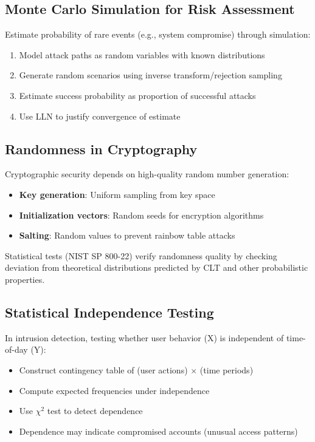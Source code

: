 \documentclass[12pt,a4paper]{article}
\begin{document}
\subsection{Monte Carlo Simulation for Risk Assessment}

Estimate probability of rare events (e.g., system compromise) through simulation:

\begin{enumerate}
\item Model attack paths as random variables with known distributions
\item Generate random scenarios using inverse transform/rejection sampling
\item Estimate success probability as proportion of successful attacks
\item Use LLN to justify convergence of estimate
\end{enumerate}

\subsection{Randomness in Cryptography}

Cryptographic security depends on high-quality random number generation:

\begin{itemize}
\item \textbf{Key generation}: Uniform sampling from key space
\item \textbf{Initialization vectors}: Random seeds for encryption algorithms
\item \textbf{Salting}: Random values to prevent rainbow table attacks
\end{itemize}

Statistical tests (NIST SP 800-22) verify randomness quality by checking deviation from theoretical distributions predicted by CLT and other probabilistic properties.

\subsection{Statistical Independence Testing}

In intrusion detection, testing whether user behavior (X) is independent of time-of-day (Y):

\begin{itemize}
\item Construct contingency table of (user actions) $\times$ (time periods)
\item Compute expected frequencies under independence
\item Use $\chi^2$ test to detect dependence
\item Dependence may indicate compromised accounts (unusual access patterns)
\end{itemize}
\end{document}
